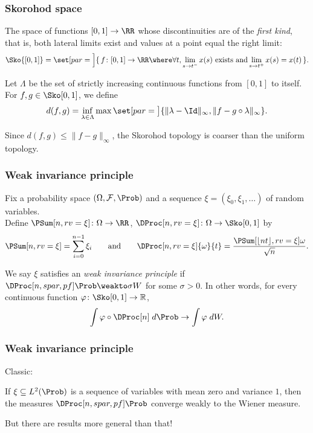 \documentclass[shortlabels, 9pt, aspectratio=2013]{beamer}
\begin{document}
\begin{frame}
  \frametitle{Skorohod space}
  \begin{definition}
    The space of functions \([0,1] \to \RR\) whose discontinuities are of the \textit{first kind}, that is, both lateral limits exist and values at a point equal the right limit:
    \begin{equation*}
      \Sko{[0,1]} = \set[par=\Big]{\, f \colon [0,1] \to \RR \where \forall t, \lim_{s \to t^-}x(s) \text{ exists and} \lim_{s \to t^+}x(s) = x(t) \,}.
    \end{equation*}
    
  \end{definition}
  \begin{definition}
    Let \(\Lambda\) be the set of strictly increasing continuous functions from \([0,1]\) to itself. For \(f,g \in \WPS\), we define
    \begin{equation}\label{eq:sko-metric}
      d(f,g) = \inf_{\lambda \in \Lambda} \max\set[par = \big]{ \lVert \lambda - \Id \rVert_{\infty}, \lVert f - g \circ \lambda \rVert_{\infty}}.
    \end{equation}
  \end{definition}
  Since \(d(f,g) \leq \lVert f - g \rVert_{\infty}\), the Skorohod topology is coarser than the uniform topology.
\end{frame}

\begin{frame}
  \frametitle{Weak invariance principle}
  Fix a probability space \((\Omega, \mathcal{F}, \Prob)\) and a sequence \(\xi = (\xi_0,\xi_1,\dots)\) of random variables.\\[1em]

  Define \(\PSum[n,rv=\xi] \colon \Omega \to \RR\), \(\DProc[n,rv=\xi] \colon \Omega \to \WPS\) by
  \[\PSum[n,rv=\xi] = \sum_{i = 0}^{n - 1}\xi_i \qquad \text{and} \qquad\DProc[n,rv=\xi]{\omega}{t} = \frac{\PSum[\floor{nt},rv=\xi]{\omega}}{\sqrt{n}}.\]
  \begin{definition}
    We say \(\xi\) satisfies an \emph{weak invariance principle} if \(\DProc[n,spar,pf]\Prob \weakto \sigma W\) for some \(\sigma > 0\). In other words, for every continuous function \(\varphi \colon \WPS \to \mathbb{R}\),
    \[\int \varphi \circ \DProc[n] \;d\Prob \to \int \varphi \;dW.\]
  \end{definition}
\end{frame}

\begin{frame}
  \frametitle{Weak invariance principle}
  Classic:
  \begin{theorem}[Donsker]
    If \(\xi \subseteq L^2(\Prob)\) is a sequence of \iid variables with mean zero and variance \(1\), then the measures \(\DProc[n,spar,pf] \Prob\) converge weakly to the Wiener measure.
  \end{theorem}
  But there are results more general than that!
\end{frame}
\end{document}
